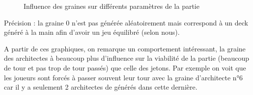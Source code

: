 \begin{figure}[H]
\begin{subfigure}[b]{0.3\textwidth}
    \end{subfigure} 
    \caption{Influence des graines sur différents paramètres de la partie}
\end{figure}

Précision : la graine 0 n'est pas générée aléatoirement mais correspond à un deck généré à la main afin d'avoir un jeu équilibré (selon nous).

A partir de ces graphiques, on remarque un comportement intéressant, la graine des architectes à beaucoup plus d'influence sur la viabilité de la partie (beaucoup de tour et pas trop de tour passés) que celle des jetons. Par exemple on voit que les joueurs sont forcés à passer souvent leur tour avec la graine d'architecte n°6 car il y a seulement 2 architectes de générés dans cette dernière.